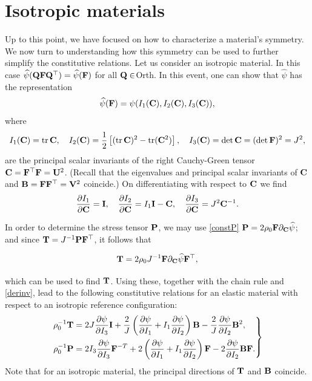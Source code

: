 \section{Isotropic materials}
Up to this point, we have focused on how to characterize a material's symmetry. We now turn to understanding how this symmetry can be used to further simplify the constitutive relations.
Let us consider an isotropic material. In this case $\widehat{\psi}(\mathbf{Q}\mathbf{F}\mathbf{Q}^\top)=\widehat{\psi}(\mathbf{F})$ for all $\mathbf{Q}\in$Orth. In this event, one can show that $\widehat{\psi}$ has the representation
\begin{equation}
\widehat{\psi}(\mathbf{F})=\psi (I_1(\mathbf{C}), I_2(\mathbf{C}), I_3(\mathbf{C})),
\end{equation}
where 
\begin{equation}
	I_1(\mathbf{C}) = \text{tr}\, \mathbf{C}, \quad I_2(\mathbf{C}) = \frac{1}{2} \left[(\text{tr}\, \mathbf{C})^2 - \text{tr}(\mathbf{C}^2)\right], \quad I_3(\mathbf{C}) = \det \mathbf{C} = (\det\mathbf{F})^2=J^2, 
\end{equation}
are the principal scalar invariants of the right Cauchy-Green tensor $\mathbf{C} = \mathbf{F}^\top \mathbf{F} = \mathbf{U}^2$. (Recall that the eigenvalues and principal scalar invariants of $\mathbf{C}$ and $\mathbf{B} = \mathbf{F} \mathbf{F}^\top = \mathbf{V}^2$ coincide.) On differentiating with respect to $\mathbf{C}$ we find
\begin{equation}\label{derinv}
	\frac{\partial I_1}{\partial \mathbf{C}} = \mathbf{I}, \quad \frac{\partial I_2}{\partial \mathbf{C}} = I_1 \mathbf{I} - \mathbf{C}, \quad \frac{\partial I_3}{\partial \mathbf{C}} = J^2 \mathbf{C}^{-1}.
\end{equation}

In order to determine the stress tensor $\mathbf{P}$, we may use \eqref{constP} $\mathbf{P} = 2\rho_0 \mathbf{F} \partial_{\mathbf{C}}\widehat{\psi}$; and since $\mathbf{T} = J^{-1} \mathbf{P} \mathbf{F}^\top$, it follows that
\begin{definition}
	\[
\mathbf{T} = 2\rho_0 J^{-1} \mathbf{F} \partial_{\mathbf{C}}\widehat{\psi}\mathbf{F}^\top,
\]
\end{definition}
which can be used to find $\mathbf{T}$. Using these, together with the chain rule and \eqref{derinv}, lead to the following constitutive relations for an elastic material with respect to an isotropic reference configuration:
\begin{equation}
	\left.
	\begin{aligned}
		\rho_0^{-1} \mathbf{T} &= 2J \frac{\partial \psi}{\partial I_3} \mathbf{I} + \frac{2}{J} \left( \frac{\partial \psi}{\partial I_1} + I_1 \frac{\partial \psi}{\partial I_2} \right) \mathbf{B} - \frac{2}{J} \frac{\partial \psi}{\partial I_2} \mathbf{B}^2, \\
		\rho_0^{-1} \mathbf{P} &= 2 I_3 \frac{\partial \psi}{\partial I_3} \mathbf{F}^{-T} + 2 \left( \frac{\partial \psi}{\partial I_1} + I_1 \frac{\partial \psi}{\partial I_2} \right) \mathbf{F} - 2 \frac{\partial \psi}{\partial I_2} \mathbf{B} \mathbf{F}.
	\end{aligned}
	\right\} 
\end{equation}
Note that for an isotropic material, the principal directions of $\mathbf{T}$ and $\mathbf{B}$ coincide.


